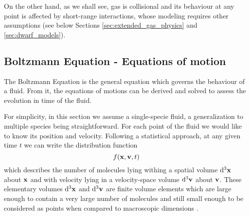 On the other hand, as we shall see, gas is collisional and its behaviour at any point is affected by short-range interactions, whose modeling requires other assumptions (see below Sections \ref{sec:extended_gas_physics} and \ref{sec:dwarf_models}).

\subsection{Boltzmann Equation - Equations of motion}
The Boltzmann Equation is the general equation which governs the behaviour of a fluid.
From it, the equations of motions can be derived and solved to assess the evolution in time of the fluid.

For simplicity, in this section we assume a single-specie fluid, a generalization to multiple species being straightforward.
For each point of the fluid we would like to know its position and velocity.
Following a statistical approach, at any given time $t$ we can write the distribution function
\begin{equation}
f(\boldsymbol{\mathbf{x}}, \boldsymbol{\mathbf{v}}, t)
\end{equation}
which describes the number of molecules lying withing a spatial volume $\dd[3]{\boldsymbol{\mathbf{x}}}$ about $\boldsymbol{\mathbf{x}}$ and with velocity lying in a velocity-space volume $\dd[3]{\boldsymbol{\mathbf{v}}}$ about $\boldsymbol{\mathbf{v}}$.
These elementary volumes $\dd[3]{\boldsymbol{\mathbf{x}}}$ and $\dd[3]{\boldsymbol{\mathbf{v}}}$ are finite volume elements which are large enough to contain a very large number of molecules and still small enough to be considered as points when compared to macroscopic dimensions \citep{Huang1987}.

